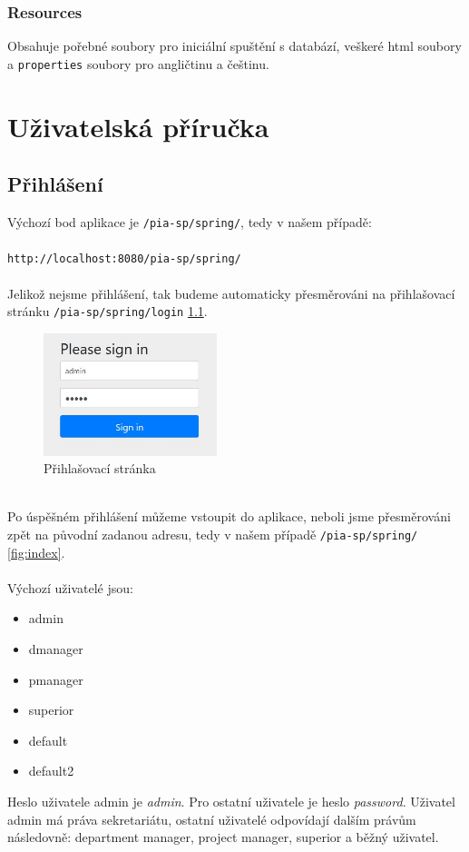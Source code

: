\documentclass[czech,P5]{thesiskiv}
\begin{document}
\subsection{Resources}
Obsahuje pořebné soubory pro iniciální spuštění s databází, veškeré html soubory a \texttt{properties} soubory pro angličtinu a češtinu.

\chapter{Uživatelská příručka}
\section{Přihlášení}
Výchozí bod aplikace je \texttt{/pia-sp/spring/}, tedy v našem případě:
\\\\
\texttt{http://localhost:8080/pia-sp/spring/}
\\\\
Jelikož nejsme přihlášení, tak budeme automaticky přesměrováni na přihlašovací stránku \texttt{/pia-sp/spring/login} \ref{fig:login}.
\begin{figure}[h]
	\centering
	\includegraphics[width=0.45\textwidth]{Images/login.jpg}
	\caption{Přihlašovací stránka}
	\label{fig:login} 
\end{figure}
\\
Po úspěšném přihlášení můžeme vstoupit do aplikace, neboli jsme přesměrováni zpět na původní zadanou adresu, tedy v našem případě \texttt{/pia-sp/spring/} \ref{fig:index}.
\\\\
Výchozí uživatelé jsou:
\begin{itemize}
             \item admin
             \item dmanager
             \item pmanager
             \item superior
             \item default
             \item default2
\end{itemize}
Heslo uživatele admin je \textit{admin}. Pro ostatní uživatele je heslo \textit{password}. Uživatel admin má práva sekretariátu, ostatní uživatelé odpovídají dalším právům následovně: department manager, project manager, superior a běžný uživatel.
\end{document}
